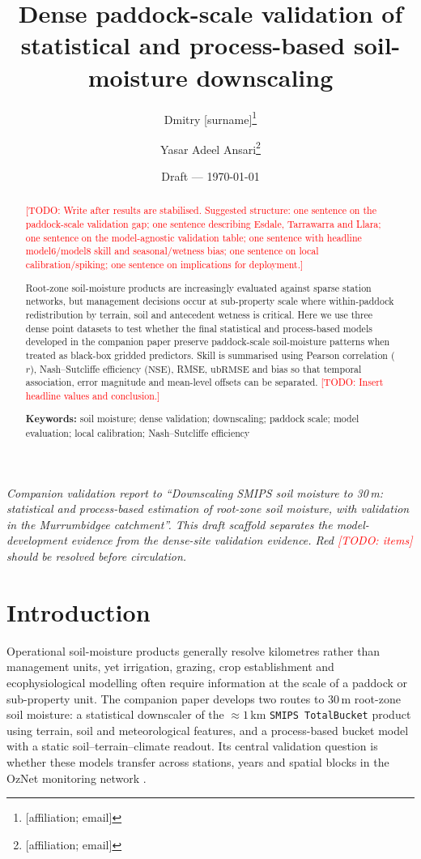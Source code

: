 \documentclass[11pt,a4paper]{article}
\title{Dense paddock-scale validation of statistical and process-based
soil-moisture downscaling}
\author{Dmitry [surname]\thanks{[affiliation; email]} \and
Yasar Adeel Ansari\thanks{[affiliation; email]}}
\date{Draft --- \today}
\newcommand{\nse}{\ensuremath{\mathrm{NSE}}}
\newcommand{\ubrmse}{\ensuremath{\mathrm{ubRMSE}}}
\newcommand{\pearsonr}{\ensuremath{r}}
\newcommand{\smips}{\texttt{SMIPS TotalBucket}}
\newcommand{\todo}[1]{\textcolor{red}{[TODO: #1]}}
\begin{document}
\maketitle

\begin{center}
\begin{minipage}{0.9\textwidth}\small\itshape
Companion validation report to ``Downscaling SMIPS soil moisture to 30\,m:
statistical and process-based estimation of root-zone soil moisture, with
validation in the Murrumbidgee catchment''.  This draft scaffold separates the
model-development evidence from the dense-site validation evidence.  Red
\todo{items} should be resolved before circulation.
\end{minipage}
\end{center}

\begin{abstract}
\todo{Write after results are stabilised. Suggested structure: one sentence on
the paddock-scale validation gap; one sentence describing Esdale, Tarrawarra and
Llara; one sentence on the model-agnostic validation table; one sentence with
headline model6/model8 skill and seasonal/wetness bias; one sentence on local
calibration/spiking; one sentence on implications for deployment.}

Root-zone soil-moisture products are increasingly evaluated against sparse
station networks, but management decisions occur at sub-property scale where
within-paddock redistribution by terrain, soil and antecedent wetness is
critical.  Here we use three dense point datasets to test whether the final
statistical and process-based models developed in the companion paper preserve
paddock-scale soil-moisture patterns when treated as black-box gridded
predictors.  Skill is summarised using Pearson correlation ($\pearsonr$),
Nash--Sutcliffe efficiency (\nse{}), RMSE, \ubrmse{} and bias so that temporal
association, error magnitude and mean-level offsets can be separated.
\todo{Insert headline values and conclusion.}

\medskip
\noindent\textbf{Keywords:} soil moisture; dense validation; downscaling;
paddock scale; model evaluation; local calibration; Nash--Sutcliffe efficiency
\end{abstract}

\section{Introduction}\label{sec:intro}

Operational soil-moisture products generally resolve kilometres rather than
management units, yet irrigation, grazing, crop establishment
and ecophysiological modelling often require information at the scale of a
paddock or sub-property unit.  The companion paper develops two routes to
30\,m root-zone soil moisture: a statistical downscaler of the
${\approx}1$\,km \smips{} product using terrain, soil and meteorological
features, and a process-based bucket model with a static soil--terrain--climate
readout.  Its central validation question is whether these models transfer
across stations, years and spatial blocks in the OzNet monitoring network
\citep{smith2012oznet}.
\end{document}

